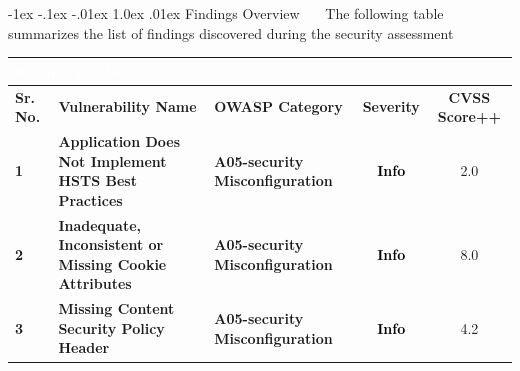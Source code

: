 \documentclass{article}
\makeatletter
\renewcommand{\section}{\@startsection{section}{1}{\z@}%
            {-1ex \@plus -.1ex \@minus -.01ex}%
            {1.0ex \@plus  .01ex}%
            {\normalfont\large\bfseries\color{sectioncolor}}}
\makeatother
\begin{document}
            \section{\large Findings Overview}
            \ \  \ The following table summarizes the list of findings discovered during the security assessment
            \begin{center}
                \begin{longtable} {|p{3em}|p{15em}|p{6em}|c|c|}
                    \hline 
                    \multicolumn{5}{|p{40em}|}{\large \cellcolor{tablecol} \textcolor{white}{\textbf{Summary Table}}} \\
                    \hline
                    \normalsize \cellcolor{tableco2} \textbf{Sr. No.} & \normalsize \cellcolor{tableco2} \textbf{Vulnerability Name} & \normalsize \cellcolor{tableco2} \textbf{OWASP Category} & \normalsize \cellcolor{tableco2} \textbf{Severity} & \normalsize \cellcolor{tableco2} \textbf{CVSS Score++} \\    
                    \hline
                    
                    \normalsize \center \textbf{1} & \normalsize \textbf{Application Does Not Implement HSTS Best Practices} & \normalsize \textbf{A05-security Misconfiguration} & \normalsize \textbf{\textcolor{infotext}{Info}} &  2.0 \\
                    \hline
                    

                    \normalsize \center \textbf{2} & \normalsize \textbf{Inadequate, Inconsistent or Missing Cookie Attributes} & \normalsize \textbf{A05-security Misconfiguration} & \normalsize \textbf{\textcolor{infotext}{Info}} &  8.0 \\
                    \hline
                    

                    \normalsize \center \textbf{3} & \normalsize \textbf{Missing Content Security Policy Header} & \normalsize \textbf{A05-security Misconfiguration} & \normalsize \textbf{\textcolor{infotext}{Info}} &  4.2 \\
                    \hline
                     
                \end{longtable}   
            \end{center}
            
            
            \newpage
\end{document}
